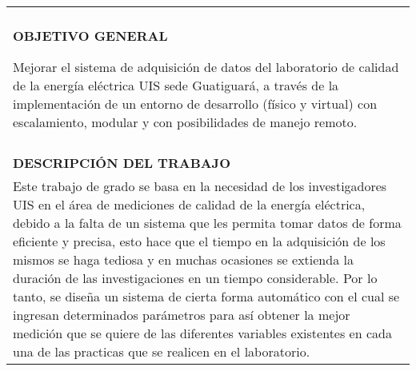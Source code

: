 \begin{tabular}{| p{15.5cm} |}
\hline
\\
\textbf{OBJETIVO GENERAL}

Mejorar el sistema de adquisición de datos del laboratorio de calidad de la energía eléctrica UIS sede Guatiguará, a través de la implementación de un entorno de desarrollo (físico y virtual) con escalamiento, modular y con posibilidades de manejo remoto.\\

\\
\textbf{DESCRIPCIÓN DEL TRABAJO}  
\\
Este trabajo de grado se basa en la necesidad de los investigadores UIS en el área de mediciones de calidad de la energía eléctrica, debido a la falta de un sistema que les permita tomar datos de forma eficiente y precisa, esto hace que el tiempo en la adquisición de los mismos se haga tediosa y en muchas ocasiones se extienda la duración de las investigaciones en un tiempo considerable. Por lo tanto, se diseña un sistema de cierta forma automático con el cual se ingresan determinados parámetros para así obtener la mejor medición que se quiere de las diferentes variables existentes en cada una de las practicas que se realicen en el laboratorio.     

\\[0.1cm] \hline
\end{tabular}
			



